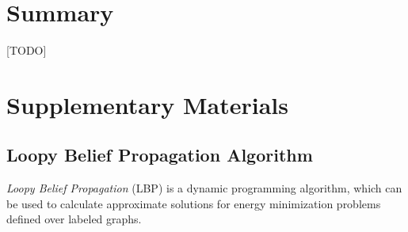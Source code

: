 \documentclass[notitlepage,english]{hgbreport}
\newcommand{\Acronym}[1]{{#1}}
\newcommand{\LBP}{\Acronym{LBP}}
\begin{document}

	






\chapter{Summary}
[TODO]


\appendix %


\chapter{Supplementary Materials}


\section{Loopy Belief Propagation Algorithm}
\label{app:LBP}
\emph{Loopy Belief Propagation} (\LBP) \cite{Felzenszwalb2006} is a dynamic programming algorithm, which can be used to calculate approximate solutions for energy minimization problems defined over labeled graphs. 
\end{document}
